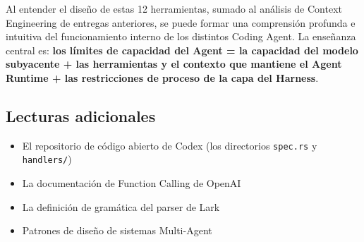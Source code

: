 \documentclass[a4paper]{article}
\begin{document}
Al entender el diseño de estas 12 herramientas, sumado al análisis de Context Engineering de entregas anteriores, se puede formar una comprensión profunda e intuitiva del funcionamiento interno de los distintos Coding Agent. La enseñanza central es: \textbf{los límites de capacidad del Agent = la capacidad del modelo subyacente + las herramientas y el contexto que mantiene el Agent Runtime + las restricciones de proceso de la capa del Harness}.

\subsection{Lecturas adicionales}

\begin{itemize}
    \item El repositorio de código abierto de Codex (los directorios \texttt{spec.rs} y \texttt{handlers/})
    \item La documentación de Function Calling de OpenAI
    \item La definición de gramática del parser de Lark
    \item Patrones de diseño de sistemas Multi-Agent
\end{itemize}

\end{document}
